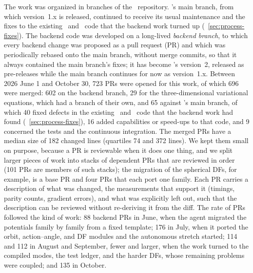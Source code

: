 The work was organized in branches of the \galpy\ repository. \galpy's
main branch, from which version~1.x is released, continued to receive
its usual maintenance and the fixes to the existing \numpy\ and \cc\
code that the backend work turned up
(\sectionname~\ref{sec:process-fixes}). The backend code was developed
on a long-lived \emph{backend branch}, to which every backend change
was proposed as a pull request (PR) and which was periodically rebased
onto the main branch, without merge commits, so that it always contained
the main branch's fixes; it has become \galpy's version~2, released as
pre-releases while the main branch continues for now as version~1.x.
Between 2026 June 1 and October 30, 723 PRs were opened for this work,
of which 696 were merged: 602 on the backend branch, 29 for the
three-dimensional variational equations, which had a branch of their
own, and 65 against \galpy's main branch, of which 40 fixed defects in
the existing \numpy\ and \cc\ code that the backend work had found
(\sectionname~\ref{sec:process-fixes}), 16 added capabilities or
speed-ups to that code, and 9 concerned the tests and the continuous
integration. The merged PRs have a median size of 182 changed lines
(quartiles 74 and 372 lines). We kept them small on purpose, because a
PR is reviewable when it does one thing, and we split larger pieces of
work into stacks of dependent PRs that are reviewed in order (101 PRs
are members of such stacks); the migration of the spherical DFs, for
example, is a base PR and four PRs that each port one family. Each PR
carries a description of what was changed, the measurements that
support it (timings, parity counts, gradient errors), and what was
explicitly left out, such that the description can be reviewed without
re-deriving it from the diff. The rate of PRs followed the kind of
work: 88 backend PRs in June, when the agent migrated the potentials
family by family from a fixed template; 176 in July, when it ported the
orbit, action--angle, and DF modules and the autonomous stretch
started; 114 and 112 in August and September, fewer and larger, when
the work turned to the compiled modes, the test ledger, and the harder
DFs, whose remaining problems were coupled; and 135 in October.

